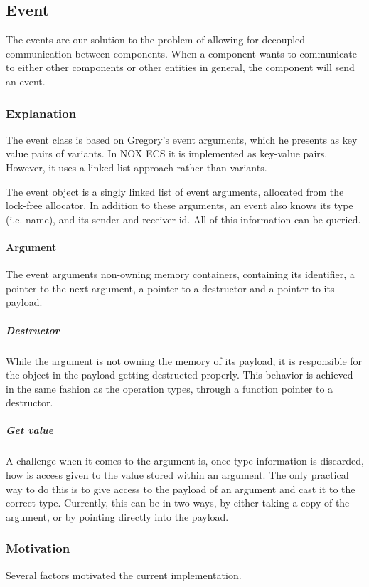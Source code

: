 \subsection{Event}
\label{subsec:detailed_event}
The events are our solution to the problem of allowing for decoupled communication
between components.
When a component wants to communicate to either other components or other entities in general, the component will send an event.


\subsubsection{Explanation}
The event class is based on Gregory's\cite[p. 938]{game_engine_architecture} event arguments, which he presents as key value pairs of variants. 
In NOX ECS it is implemented as key-value pairs. 
However, it uses a linked list approach rather than variants.

The event object is a singly linked list of event arguments, allocated from
the lock-free allocator.
In addition to these arguments, an event also knows its type (i.e. name), and its sender and receiver id. 
All of this information can be queried.

\paragraph{Argument}
The event arguments non-owning memory containers, containing its identifier,
a pointer to the next argument, a pointer to a destructor and a pointer to its payload.

\subparagraph{Destructor}
While the argument is not owning the memory of its payload, it is responsible for the object
in the payload getting destructed properly.
This behavior is achieved in the same fashion as the operation types, through a function pointer to a destructor.

\subparagraph{Get value}
A challenge when it comes to the argument is, once type information is discarded, how is access given to the value stored within an argument.
The only practical way to do this is to give access to the payload of an argument and cast it to the correct type. Currently, this can be in two ways, by either taking a copy of the argument,
or by pointing directly into the payload.

\subsubsection{Motivation}
Several factors motivated the current implementation.

